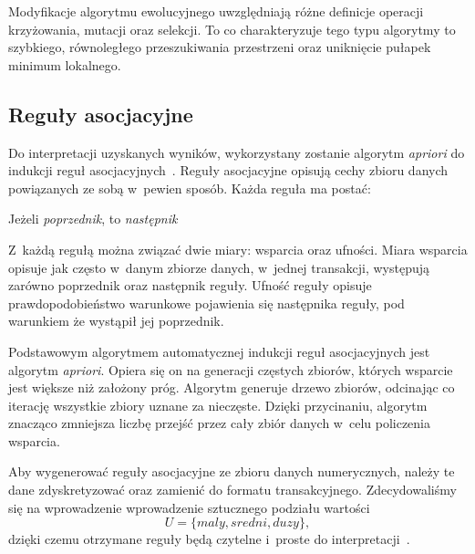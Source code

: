 Modyfikacje algorytmu ewolucyjnego uwzględniają różne definicje operacji krzyżowania, mutacji oraz selekcji. To co charakteryzuje tego typu algorytmy to szybkiego, równoległego przeszukiwania przestrzeni oraz uniknięcie pułapek minimum lokalnego.


\subsection{Reguły asocjacyjne}
\label{subsec:rules}
Do interpretacji uzyskanych wyników, wykorzystany zostanie algorytm \emph{apriori} do indukcji reguł asocjacyjnych~\cite{agrawal1996fast}. Reguły asocjacyjne opisują cechy zbioru danych powiązanych ze sobą w~pewien sposób. Każda reguła ma postać:

\begin{center}
    Jeżeli \emph{poprzednik}, to \emph{następnik} 
\end{center}

Z~każdą regułą można związać dwie miary: wsparcia oraz ufności. Miara wsparcia opisuje jak często w~danym zbiorze danych, w~jednej transakcji, występują zarówno poprzednik oraz następnik reguły. Ufność reguły opisuje prawdopodobieństwo warunkowe pojawienia się następnika reguły, pod warunkiem że wystąpił jej poprzednik.

Podstawowym algorytmem automatycznej indukcji reguł asocjacyjnych jest algorytm \emph{apriori}. Opiera się on na generacji częstych zbiorów, których wsparcie jest większe niż założony próg. Algorytm generuje drzewo zbiorów, odcinając co iterację wszystkie zbiory uznane za nieczęste. Dzięki przycinaniu, algorytm znacząco zmniejsza liczbę przejść przez cały zbiór danych w~celu policzenia wsparcia.

Aby wygenerować reguły asocjacyjne ze zbioru danych numerycznych, należy te dane zdyskretyzować oraz zamienić do formatu transakcyjnego. Zdecydowaliśmy się na wprowadzenie wprowadzenie sztucznego podziału wartości $$U = \{maly, sredni, duzy\},$$
dzięki czemu otrzymane reguły będą czytelne i~proste do interpretacji~\cite{agrawal1996fast}.